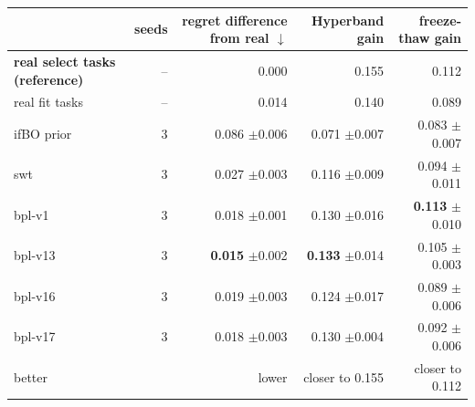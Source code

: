 \begin{tabular}{lrrrr}
\toprule
 & seeds & regret difference from real $\downarrow$ & Hyperband gain & freeze-thaw gain \\
\midrule
\textbf{real select tasks (reference)} & -- & 0.000 & 0.155 & 0.112 \\
real fit tasks & -- & 0.014 & 0.140 & 0.089 \\
\midrule
ifBO prior & 3 & 0.086 {\scriptsize$\pm$0.006} & 0.071 {\scriptsize$\pm$0.007} & 0.083 {\scriptsize$\pm$0.007} \\
swt & 3 & 0.027 {\scriptsize$\pm$0.003} & 0.116 {\scriptsize$\pm$0.009} & 0.094 {\scriptsize$\pm$0.011} \\
bpl-v1 & 3 & 0.018 {\scriptsize$\pm$0.001} & 0.130 {\scriptsize$\pm$0.016} & \textbf{0.113} {\scriptsize$\pm$0.010} \\
bpl-v13 & 3 & \textbf{0.015} {\scriptsize$\pm$0.002} & \textbf{0.133} {\scriptsize$\pm$0.014} & 0.105 {\scriptsize$\pm$0.003} \\
bpl-v16 & 3 & 0.019 {\scriptsize$\pm$0.003} & 0.124 {\scriptsize$\pm$0.017} & 0.089 {\scriptsize$\pm$0.006} \\
bpl-v17 & 3 & 0.018 {\scriptsize$\pm$0.003} & 0.130 {\scriptsize$\pm$0.004} & 0.092 {\scriptsize$\pm$0.006} \\
\midrule
better & & lower & closer to 0.155 & closer to 0.112 \\
\bottomrule
\end{tabular}
